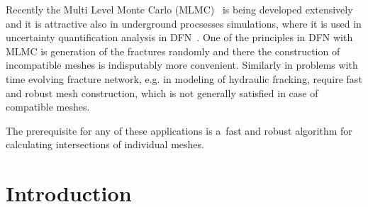 Recently the Multi Level Monte Carlo (MLMC)~\cite{giles_mlmc_2015} is being developed extensively and it is attractive also
in underground procsesses simulations, where it is used in uncertainty quantification analysis in DFN~\cite{berrone_uncertainty_2015, berrone_uncertainty_2018}.
One of the principles in DFN with MLMC is generation of the fractures randomly and there the construction of 
incompatible meshes is indisputably more convenient.
Similarly in problems with time evolving fracture network, e.g. in modeling of hydraulic fracking,
require fast and robust mesh construction, which is not generally satisfied in case of compatible meshes.

The prerequisite for any of these applications is a~fast and robust algorithm for calculating intersections of individual meshes.



\section{Introduction}

